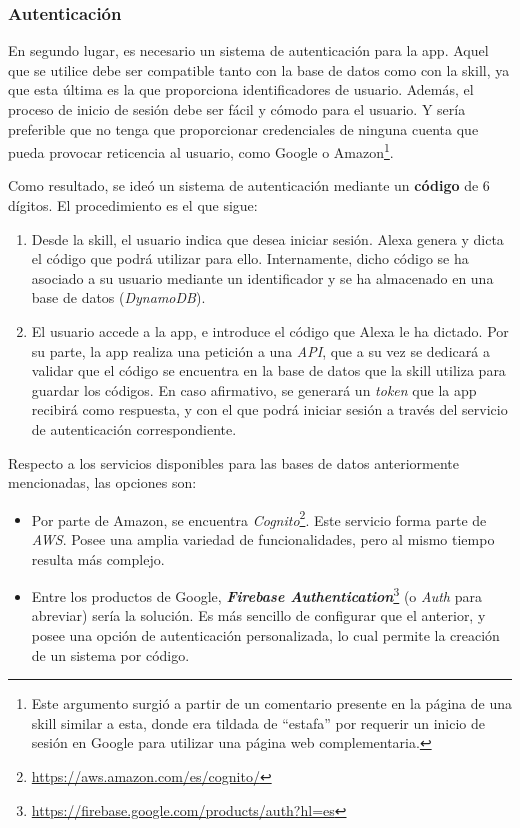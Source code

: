 \documentclass[11pt,spanish,listoffigures,listoftables,table,hyphens,dvipsnames]{tfgetsinf}
\begin{document}
\subsubsection{Autenticación}
\label{seccion:auth}

En segundo lugar, es necesario un sistema de autenticación para la app. Aquel que se utilice debe ser compatible tanto con la base de datos como con la skill, ya que esta última es la que proporciona identificadores de usuario. Además, el proceso de inicio de sesión debe ser fácil y cómodo para el usuario. Y sería preferible que no tenga que proporcionar credenciales de ninguna cuenta que pueda provocar reticencia al usuario, como Google o Amazon\footnote{Este argumento surgió a partir de un comentario presente en la página de una skill similar a esta, donde era tildada de ``estafa'' por requerir un inicio de sesión en Google para utilizar una página web complementaria.}.

Como resultado, se ideó un sistema de autenticación mediante un \textbf{código} de 6 dígitos. El procedimiento es el que sigue:

\begin{enumerate}
   \item Desde la skill, el usuario indica que desea iniciar sesión. Alexa genera y dicta el código que podrá utilizar para ello. Internamente, dicho código se ha asociado a su usuario mediante un identificador y se ha almacenado en una base de datos (\textit{DynamoDB}).
   \item El usuario accede a la app, e introduce el código que Alexa le ha dictado. Por su parte, la app realiza una petición a una \emph{API}, que a su vez se dedicará a validar que el código se encuentra en la base de datos que la skill utiliza para guardar los códigos. En caso afirmativo, se generará un \textit{token} que la app recibirá como respuesta, y con el que podrá iniciar sesión a través del servicio de autenticación correspondiente.
\end{enumerate}

Respecto a los servicios disponibles para las bases de datos anteriormente mencionadas, las opciones son:

\begin{itemize}
   \item Por parte de Amazon, se encuentra \emph{Cognito}\footnote{\url{https://aws.amazon.com/es/cognito/}}. Este servicio forma parte de \emph{AWS}. Posee una amplia variedad de funcionalidades, pero al mismo tiempo resulta más complejo.
   \item Entre los productos de Google, \textbf{\emph{Firebase Authentication}}\footnote{\url{https://firebase.google.com/products/auth?hl=es}} (o \emph{Auth} para abreviar) sería la solución. Es más sencillo de configurar que el anterior, y posee una opción de autenticación personalizada, lo cual permite la creación de un sistema por código.
\end{itemize}
\end{document}
